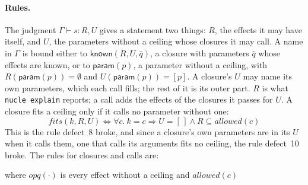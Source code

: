 \documentclass[11pt,a4paper]{article}
\newcommand{\allowed}{\mathit{allowed}}
\newcommand{\known}{\mathsf{known}}
\newcommand{\param}{\mathsf{param}}
\newcommand{\fits}{\mathit{fits}}
\newcommand{\opq}{\mathit{opq}}
\newcommand{\app}{\mathbin{+\!\!+}}
\newcommand{\nsl}[1]{\texttt{#1}}
\begin{document}
\paragraph{Rules.} The judgment $\Gamma \vdash s : R, U$ gives a
statement two things: $R$, the effects it may have itself, and $U$, the
parameters without a ceiling whose closures it may call. A name in
$\Gamma$ is bound either to $\known(R, U, \bar{q})$, a closure with
parameters $\bar{q}$ whose effects are known, or to $\param(p)$, a
parameter without a ceiling, with $R(\param(p)) = \emptyset$ and
$U(\param(p)) = [p]$. A closure's $U$ may name its own parameters, which
each call fills; the rest of it is its outer part. $R$ is what
\nsl{nucle explain} reports; a call adds the effects of the closures it
passes for $U$. A closure fits a ceiling only if it calls no parameter
without one:
\[
\fits(k, R, U) \iff \forall c.\ k = c \Rightarrow U = [\,] \wedge R \subseteq \allowed(c)
\]
This is the rule defect~8 broke, and since a closure's own parameters are
in its $U$ when it calls them, one that calls its arguments fits no
ceiling, the rule defect~10 broke. The rules for closures and calls are:
where $\opq(\cdot)$ is every effect without a ceiling and $\allowed(c)$
\end{document}
